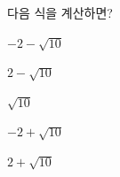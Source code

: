 다음 식을 계산하면?
\begin{choices32}{\rule[-3ex]{0pt}{8ex}$-2-\sqrt{10}$}{\rule[-3ex]{0pt}{8ex}$2-\sqrt{10}$}{\rule[-3ex]{0pt}{8ex}$\sqrt{10}$}{\rule[-3ex]{0pt}{8ex}$-2+\sqrt{10}$}{\rule[-3ex]{0pt}{8ex}$2+\sqrt{10}$}\end{choices32}
